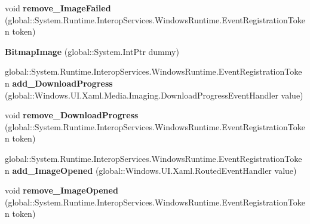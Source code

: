 \begin{DoxyCompactItemize}
\item 
\mbox{\label{class_windows_1_1_u_i_1_1_xaml_1_1_media_1_1_imaging_1_1_bitmap_image_ab71236e1ec9898c1f9eb8269ae973f2f}} 
void {\bfseries remove\+\_\+\+Image\+Failed} (global\+::\+System.\+Runtime.\+Interop\+Services.\+Windows\+Runtime.\+Event\+Registration\+Token token)
\item 
\mbox{\label{class_windows_1_1_u_i_1_1_xaml_1_1_media_1_1_imaging_1_1_bitmap_image_a44808406b9149bd4c36e0a7b1ab40dc8}} 
{\bfseries Bitmap\+Image} (global\+::\+System.\+Int\+Ptr dummy)
\item 
\mbox{\label{class_windows_1_1_u_i_1_1_xaml_1_1_media_1_1_imaging_1_1_bitmap_image_ad8b669920d50527747f0632426807fbf}} 
global\+::\+System.\+Runtime.\+Interop\+Services.\+Windows\+Runtime.\+Event\+Registration\+Token {\bfseries add\+\_\+\+Download\+Progress} (global\+::\+Windows.\+U\+I.\+Xaml.\+Media.\+Imaging.\+Download\+Progress\+Event\+Handler value)
\item 
\mbox{\label{class_windows_1_1_u_i_1_1_xaml_1_1_media_1_1_imaging_1_1_bitmap_image_a2eb34dc2eba36825836cc7578bc62ad3}} 
void {\bfseries remove\+\_\+\+Download\+Progress} (global\+::\+System.\+Runtime.\+Interop\+Services.\+Windows\+Runtime.\+Event\+Registration\+Token token)
\item 
\mbox{\label{class_windows_1_1_u_i_1_1_xaml_1_1_media_1_1_imaging_1_1_bitmap_image_a009137ccb3242294d0b233b43447b15e}} 
global\+::\+System.\+Runtime.\+Interop\+Services.\+Windows\+Runtime.\+Event\+Registration\+Token {\bfseries add\+\_\+\+Image\+Opened} (global\+::\+Windows.\+U\+I.\+Xaml.\+Routed\+Event\+Handler value)
\item 
\mbox{\label{class_windows_1_1_u_i_1_1_xaml_1_1_media_1_1_imaging_1_1_bitmap_image_abd3f6dad75c8f3bd98204092748f8218}} 
void {\bfseries remove\+\_\+\+Image\+Opened} (global\+::\+System.\+Runtime.\+Interop\+Services.\+Windows\+Runtime.\+Event\+Registration\+Token token)

\end{DoxyCompactItemize}
